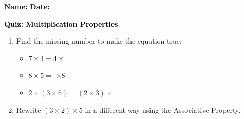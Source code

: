 \documentclass[12pt, letterpaper, fleqn]{article}
\newcommand{\blank}{\underline{\hspace{2.2cm}}}
\newcommand{\blanklong}{\underline{\hspace{6.5cm}}}
\begin{document}
\textbf{Name:} \underline{\hspace{5cm}}
\hfill
\textbf{Date:} \underline{\hspace{3cm}}\\

\begin{tcolorbox}[colback=customteal!20]
    \large\textcolor{black}{\textbf{Quiz: Multiplication Properties}}
\end{tcolorbox}

\vspace{5mm}
\begin{enumerate}[itemsep=2cm, leftmargin=0.6cm]
\item Find the missing number to make the equation true:
\begin{itemize}[itemsep=1cm]
  \item $7 \times 4 = 4 \times$ \blank
  \item $8 \times 5 = $ \blank $\times 8$
  \item $2 \times (3 \times 6) = (2 \times 3) \times$ \blank
\end{itemize}

\item Rewrite $(3 \times 2) \times 5$ in a different way using the Associative Property.
\\ \\
\blanklong
\end{enumerate}
\end{document}
